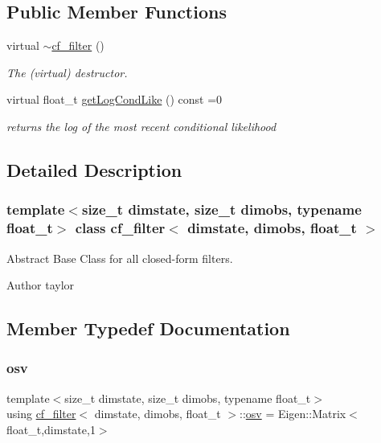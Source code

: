 \subsection*{Public Member Functions}
\begin{DoxyCompactItemize}
\item 
\mbox{\label{classcf__filter_afd3e7b3c1c0cc86257b406d494b0a7c9}} 
virtual \hyperlink{classcf__filter_afd3e7b3c1c0cc86257b406d494b0a7c9}{$\sim$cf\+\_\+filter} ()
\begin{DoxyCompactList}\small\item\em The (virtual) destructor. \end{DoxyCompactList}\item 
virtual float\+\_\+t \hyperlink{classcf__filter_a11b26307172bf94b8075ed2cdb8fc09c}{get\+Log\+Cond\+Like} () const =0
\begin{DoxyCompactList}\small\item\em returns the log of the most recent conditional likelihood \end{DoxyCompactList}\end{DoxyCompactItemize}


\subsection{Detailed Description}
\subsubsection*{template$<$size\+\_\+t dimstate, size\+\_\+t dimobs, typename float\+\_\+t$>$\newline
class cf\+\_\+filter$<$ dimstate, dimobs, float\+\_\+t $>$}

Abstract Base Class for all closed-\/form filters. 

\begin{DoxyAuthor}{Author}
taylor 
\end{DoxyAuthor}


\subsection{Member Typedef Documentation}
\mbox{\label{classcf__filter_a91d9961b2ecd202b1400c401434b392d}} 
\subsubsection{\texorpdfstring{osv}{osv}}
{\footnotesize\ttfamily template$<$size\+\_\+t dimstate, size\+\_\+t dimobs, typename float\+\_\+t$>$ \\
using \hyperlink{classcf__filter}{cf\+\_\+filter}$<$ dimstate, dimobs, float\+\_\+t $>$\+::\hyperlink{classcf__filter_a91d9961b2ecd202b1400c401434b392d}{osv} =  Eigen\+::\+Matrix$<$float\+\_\+t,dimstate,1$>$}

